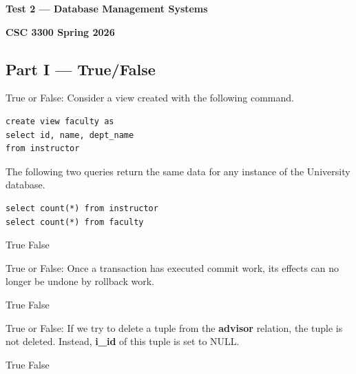 \documentclass[12pt]{exam}
\begin{document}
\begin{center}
\textbf{\Large Test 2 — Database Management Systems}

\textbf{CSC 3300 \quad Spring 2026}
\end{center}

\begin{questions}
\section*{Part I — True/False}

\begin{minipage}{\linewidth}
\question[2]
True or False: Consider a view created with the following command.\par\vspace{0.5em}
\begin{verbatim}
create view faculty as
select id, name, dept_name
from instructor
\end{verbatim}
The following two queries return the same data for any instance of the University database.\par\vspace{0.5em}
\begin{verbatim}
select count(*) from instructor
select count(*) from faculty
\end{verbatim}
\begin{checkboxes}
    \choice True
    \CorrectChoice False
\end{checkboxes}
\end{minipage}\vspace{1em}

\begin{minipage}{\linewidth}
\question[2]
True or False: Once a transaction has executed commit work, its effects can no longer be undone by rollback work.\par\vspace{0.5em}
\begin{checkboxes}
    \CorrectChoice True
    \choice False
\end{checkboxes}
\end{minipage}\vspace{1em}

\begin{minipage}{\linewidth}
\question[2]
True or False: If we try to delete a tuple from the \textbf{advisor} relation, the tuple is not deleted. Instead, \textbf{i\_id} of this tuple is set to NULL.\par\vspace{0.5em}
\begin{checkboxes}
    \choice True
    \CorrectChoice False
\end{checkboxes}
\end{minipage}\vspace{1em}


\end{questions}
\end{document}
